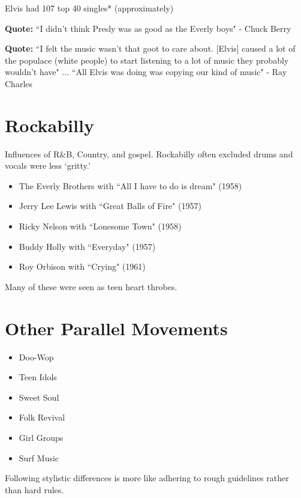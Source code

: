 \documentclass[12pt, a4paper, twoside, openright, titlepage]{book}
\begin{document}
\begin{rmk}{}{}
    Elvis had 107 top 40 singles* (approximately)
\end{rmk}

\textbf{Quote:} ``I didn't think Presly was as good as the Everly boys" - Chuck Berry

\textbf{Quote:} ``I felt the music wasn't that goot to care about. [Elvis] caused a lot of the populace (white people) to start listening to a lot of music they probably wouldn't have" ... ``All Elvis was doing was copying our kind of music" - Ray Charles


\section{Rockabilly}

Influences of R\&B, Country, and gospel. Rockabilly often excluded drums and vocals were less `gritty.'

\begin{eg}{}{}
    \leavevmode
    \begin{itemize}
        \item The Everly Brothers with ``All I have to do is dream" (1958)
        \item Jerry Lee Lewis with ``Great Balls of Fire" (1957)
        \item Ricky Nelson with ``Lonesome Town" (1958)
        \item Buddy Holly with ``Everyday" (1957)
        \item Roy Orbison with ``Crying" (1961)
    \end{itemize}
\end{eg}
Many of these were seen as teen heart throbes.


\section{Other Parallel Movements}

\begin{itemize}
    \item Doo-Wop
    \item Teen Idols
    \item Sweet Soul
    \item Folk Revival
    \item Girl Groups
    \item Surf Music
\end{itemize}

\begin{note}
    Following stylistic differences is more like adhering to rough guidelines rather than hard rules.
\end{note}
\end{document}
